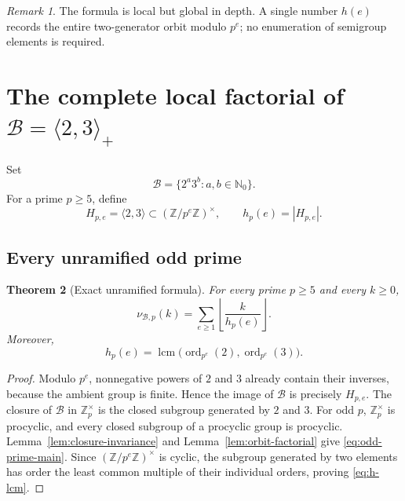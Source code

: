 \documentclass[11pt,oneside]{article}
\newtheorem{theorem}{Theorem}[section]
\theoremstyle{definition}
\theoremstyle{remark}
\newtheorem{remark}[theorem]{Remark}
\newcommand{\Nzero}{\mathbb N_0}
\newcommand{\Z}{\mathbb Z}
\newcommand{\B}{\mathcal B}
\newcommand{\ord}{\operatorname{ord}}
\newcommand{\lcm}{\operatorname{lcm}}
\newcommand{\floor}[1]{\left\lfloor #1\right\rfloor}
\begin{document}
\begin{remark}
The formula is local but global in depth.  A single number \(h(e)\) records the entire
two-generator orbit modulo \(p^e\); no enumeration of semigroup elements is required.
\end{remark}

\section{The complete local factorial of \(\B=\langle2,3\rangle_+\)}
\label{sec:local-factorial}

Set
\[
  \B=\{2^a3^b:a,b\in\Nzero\}.
\]
For a prime \(p\ge5\), define
\begin{equation}
  H_{p,e}=\langle2,3\rangle\subset(\Z/p^e\Z)^\times,
  \qquad
  h_p(e)=|H_{p,e}|.
  \label{eq:hp-def}
\end{equation}

\subsection{Every unramified odd prime}

\begin{theorem}[Exact unramified formula]
\label{thm:odd-prime-formula}
For every prime \(p\ge5\) and every \(k\ge0\),
\begin{equation}
  \boxed{\displaystyle
  \nu_{\B,p}(k)=\sum_{e\ge1}\floor{\frac{k}{h_p(e)}}.}
  \label{eq:odd-prime-main}
\end{equation}
Moreover,
\begin{equation}
  h_p(e)=\lcm\bigl(\ord_{p^e}(2),\ord_{p^e}(3)\bigr).
  \label{eq:h-lcm}
\end{equation}
\end{theorem}

\begin{proof}
Modulo \(p^e\), nonnegative powers of \(2\) and \(3\) already contain their inverses, because
the ambient group is finite.  Hence the image of \(\B\) is precisely \(H_{p,e}\).  The closure
of \(\B\) in \(\Z_p^\times\) is the closed subgroup generated by \(2\) and \(3\).
For odd \(p\), \(\Z_p^\times\) is procyclic, and every closed subgroup of a procyclic group is
procyclic.  Lemma~\ref{lem:closure-invariance} and Lemma~\ref{lem:orbit-factorial} give
\eqref{eq:odd-prime-main}.  Since \((\Z/p^e\Z)^\times\) is cyclic, the subgroup generated by
two elements has order the least common multiple of their individual orders, proving
\eqref{eq:h-lcm}.
\end{proof}
\end{document}
